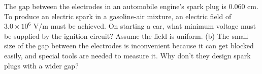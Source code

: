 The gap between the electrodes in an automobile
        engine's spark plug is 0.060 cm.  To produce an electric
        spark in a gasoline-air mixture, an electric field of
        $3.0\times10^6$  V/m must be achieved.  On starting a car,
        what minimum voltage must be supplied by the ignition
        circuit? Assume the field is uniform.\answercheck\hwendpart
        (b) The small size
        of the gap between the electrodes is inconvenient because it
        can get blocked easily, and special tools are needed to
        measure it.  Why don't they design spark plugs with a wider gap?
